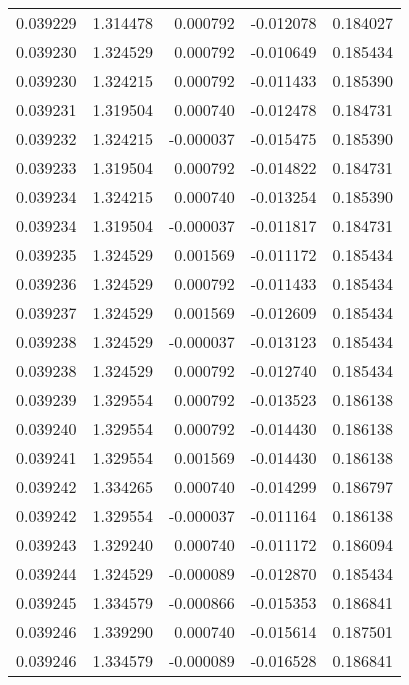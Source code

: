 \begin{tabular}{lrrrr}
0.039229    &  1.314478 &  0.000792 & -0.012078 &             0.184027 \\
0.039230    &  1.324529 &  0.000792 & -0.010649 &             0.185434 \\
0.039230    &  1.324215 &  0.000792 & -0.011433 &             0.185390 \\
0.039231    &  1.319504 &  0.000740 & -0.012478 &             0.184731 \\
0.039232    &  1.324215 & -0.000037 & -0.015475 &             0.185390 \\
0.039233    &  1.319504 &  0.000792 & -0.014822 &             0.184731 \\
0.039234    &  1.324215 &  0.000740 & -0.013254 &             0.185390 \\
0.039234    &  1.319504 & -0.000037 & -0.011817 &             0.184731 \\
0.039235    &  1.324529 &  0.001569 & -0.011172 &             0.185434 \\
0.039236    &  1.324529 &  0.000792 & -0.011433 &             0.185434 \\
0.039237    &  1.324529 &  0.001569 & -0.012609 &             0.185434 \\
0.039238    &  1.324529 & -0.000037 & -0.013123 &             0.185434 \\
0.039238    &  1.324529 &  0.000792 & -0.012740 &             0.185434 \\
0.039239    &  1.329554 &  0.000792 & -0.013523 &             0.186138 \\
0.039240    &  1.329554 &  0.000792 & -0.014430 &             0.186138 \\
0.039241    &  1.329554 &  0.001569 & -0.014430 &             0.186138 \\
0.039242    &  1.334265 &  0.000740 & -0.014299 &             0.186797 \\
0.039242    &  1.329554 & -0.000037 & -0.011164 &             0.186138 \\
0.039243    &  1.329240 &  0.000740 & -0.011172 &             0.186094 \\
0.039244    &  1.324529 & -0.000089 & -0.012870 &             0.185434 \\
0.039245    &  1.334579 & -0.000866 & -0.015353 &             0.186841 \\
0.039246    &  1.339290 &  0.000740 & -0.015614 &             0.187501 \\
0.039246    &  1.334579 & -0.000089 & -0.016528 &             0.186841 \\

\end{tabular}
